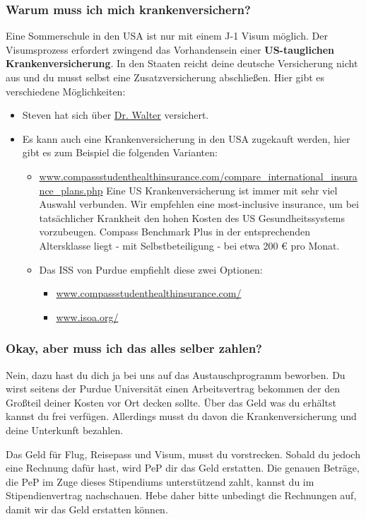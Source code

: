 \documentclass[
  paper=a4,
  fontsize=12pt,
  DIV=16,
  headheight=52pt,
  footheight=45pt,
  headinclude,
  parskip=full,
]{scrartcl}
\begin{document}
\subsubsection*{Warum muss ich mich krankenversichern?}
Eine Sommerschule in den USA ist nur mit einem J-1 Visum möglich.
Der Visumsprozess erfordert zwingend das Vorhandensein einer \textbf{US-tauglichen Krankenversicherung}.
In den Staaten reicht deine deutsche Versicherung nicht aus und du musst selbst eine Zusatzversicherung abschließen.
Hier gibt es verschiedene Möglichkeiten:
\begin{itemize}
  \item Steven hat sich über \href{https://www.dr-walter.com/index.html}{Dr. Walter}
        versichert.
  \item Es kann auch eine Krankenversicherung in den USA zugekauft werden, hier
  gibt es zum Beispiel die folgenden Varianten:
  \begin{itemize}
    \item \url{www.compassstudenthealthinsurance.com/compare_international_insurance_plans.php}
    Eine US Krankenversicherung ist immer mit sehr viel Auswahl verbunden.
    Wir empfehlen eine most-inclusive insurance, um bei tatsächlicher Krankheit den hohen Kosten des US Gesundheitssystems vorzubeugen.
    Compass Benchmark Plus in der entsprechenden Altersklasse liegt - mit Selbstbeteiligung - bei etwa 200 € pro Monat.
    \item Das ISS von Purdue empfiehlt diese zwei Optionen:
    \begin{itemize}
      \item \url{www.compassstudenthealthinsurance.com/}
      \item \url{www.isoa.org/}
    \end{itemize}
  \end{itemize}
\end{itemize}

\subsubsection*{Okay, aber muss ich das alles selber zahlen?}
Nein, dazu hast du dich ja bei uns auf das Austauschprogramm beworben.
Du wirst seitens der Purdue Universität einen Arbeitsvertrag bekommen der den Großteil deiner Kosten vor Ort decken sollte.
Über das Geld was du erhältst kannst du frei verfügen.
Allerdings musst du davon die Krankenversicherung und deine Unterkunft bezahlen.

Das Geld für Flug, Reisepass und Visum, musst du vorstrecken.
Sobald du jedoch eine Rechnung dafür hast, wird PeP dir das Geld erstatten.
Die genauen Beträge, die PeP im Zuge dieses Stipendiums unterstützend zahlt, kannst du im Stipendienvertrag nachschauen.
Hebe daher bitte unbedingt die Rechnungen auf, damit wir das Geld erstatten können.
\end{document}
